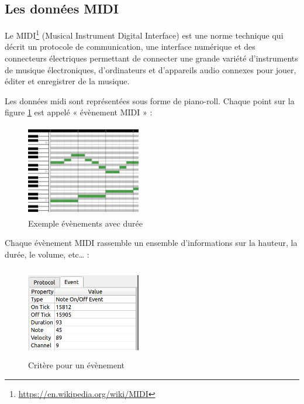\subsection*{Les données MIDI}
Le MIDI\footnote{\url{https://en.wikipedia.org/wiki/MIDI}} (Musical Instrument Digital Interface) 
est une norme technique qui décrit un protocole de communication, une interface numérique et des connecteurs électriques permettant de connecter une grande variété d’instruments de musique électroniques, d’ordinateurs et d’appareils audio connexes pour jouer, éditer et enregistrer de la musique.

Les données midi sont représentées sous forme de piano-roll. 
%
Chaque point sur la figure \ref{piano_roll} est appelé « évènement MIDI » :
\begin{figure}[!h]
	\centering
	\includegraphics[height=40mm, width=50mm]{z_images/1_contexte/2_midi_piano.jpg}
	\caption{Exemple évènements avec durée}
	\label{piano_roll}
\end{figure}

Chaque évènement MIDI rassemble un ensemble d’informations sur la hauteur, la durée, le volume, etc… :
\begin{figure}[h!]
	\centering
	\includegraphics[height=40mm, width=50mm]{z_images/1_contexte/3_evenements_midi.png}
	\caption{Critère pour un évènement}
\end{figure} %
{}

